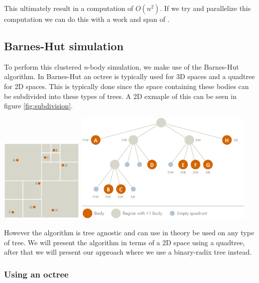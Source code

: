 This ultimately result in a computation of $O(n^2)$.
If we try and parallelize this computation we can do this with a work and span of .

\subsection{Barnes-Hut simulation}
To perform this clustered \textit{n}-body simulation, we make use of the
Barnes-Hut algorithm\cite{BH-algo}. In Barnes-Hut an octree is typically used for 3D
spaces and a quadtree for 2D spaces. This is typically done since the space
containing these bodies can be subdivided into these types of trees. A 2D
exmaple of this can be seen in figure \ref{fig:subdivision}.

\begin{Figure}
  \centering
  \includegraphics[width=0.30\textwidth]{assests/example-space}
  \includegraphics[width=0.65\textwidth]{assests/example-tree}
  \label{fig:subdivision}
\end{Figure}

However the algorithm is tree agnostic and can use in theory be used on any type
of tree. We will present the algorithm in terms of a 2D space using a quadtree,
after that we will present our approach where we use a binary-radix tree instead.
\subsubsection{Using an octree}
